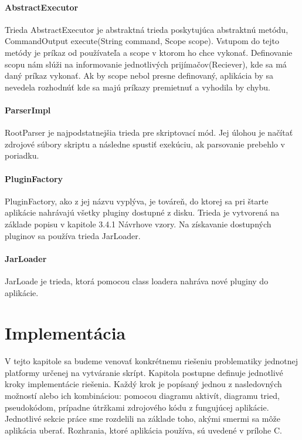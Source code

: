 \paragraph{AbstractExecutor}
Trieda AbstractExecutor je abstraktná trieda poskytujúca abstraktnú metódu,  CommandOutput execute(String command, Scope scope). Vstupom do tejto metódy je príkaz od používateľa a scope v ktorom ho chce vykonať. Definovanie scopu nám slúži na informovanie jednotlivých prijímačov(Reciever), kde sa má daný príkaz vykonať. Ak by scope nebol presne definovaný, aplikácia by sa nevedela rozhodnúť kde sa majú príkazy premietnuť a vyhodila by chybu.
\paragraph{ParserImpl}
RootParser je najpodstatnejšia trieda pre skriptovací mód. Jej úlohou je načítať zdrojové súbory skriptu a následne spustiť exekúciu, ak parsovanie prebehlo v poriadku.
\paragraph{PluginFactory}
PluginFactory, ako z jej názvu vyplýva, je továreň, do ktorej sa pri štarte aplikácie nahrávajú všetky pluginy dostupné z disku. Trieda je vytvorená na základe popisu v kapitole 3.4.1 Návrhove vzory. Na získavanie dostupných pluginov sa používa trieda JarLoader. 
\paragraph{JarLoader}
JarLoade je trieda, ktorá pomocou class loadera nahráva nové pluginy do aplikácie.
\section{Implementácia}
\indent V tejto kapitole sa budeme venovať konkrétnemu riešeniu problematiky jednotnej platformy určenej na vytváranie skrípt. Kapitola postupne definuje jednotlivé kroky implementácie riešenia. Každý krok je popísaný jednou z nasledovných možností alebo ich kombináciou: pomocou diagramu aktivít, diagramu tried, pseudokódom, prípadne útržkami zdrojového kódu z fungujúcej aplikácie. Jednotlivé sekcie práce sme rozdelili na základe toho, akými smermi sa môže aplikácia uberať. Rozhrania, ktoré aplikácia používa, sú uvedené v prílohe C.
